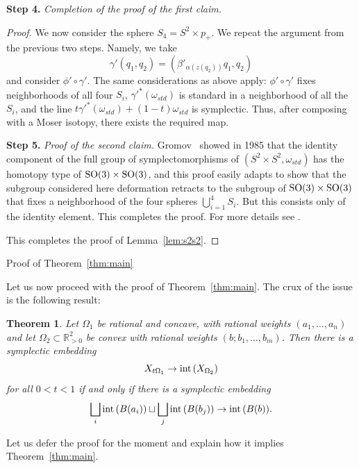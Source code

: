 \documentclass[11pt, reqno]{amsart}
\makeatletter
\def\subsection{\@startsection{subsection}{2}%
  \z@{.75\linespacing\@plus.7\linespacing}{-.5em}%
  {\normalfont\large\bfseries}}
\newtheorem{thm}{Theorem}[subsection]
\theoremstyle{remark}
\numberwithin{equation}{subsection}
\numberwithin{figure}{section}
\theoremstyle{customremark}
\newcommand{\SO}{{\rm SO}}
\newcommand{\intt}{{\rm int}}
\newcommand{\NI}{{\noindent}}
\newcommand{\om}{{\omega}}
\newcommand{\MS}{{\medskip}}
\newcommand{\R}{\mathbb{R}}
\makeatother
\begin{document}
\NI
{\bf Step 4.}  {\it Completion of the proof of the first claim.}
\begin{proof}
We now consider the sphere $S_4 = S^2 \times p_+$.  We repeat the argument from the previous two steps.  Namely, we take 
\[ \gamma'(q_1, q_2) = (\beta'_{\alpha(z(q_2))} q_1, q_2)\]
and consider $\phi' \circ \gamma'$. 
The same considerations as above apply: $\phi' \circ \gamma'$ fixes neighborhoods of all four $S_i$, $\gamma'^*(\om_{std})$
 is standard in a neighborhood of all the $S_i$, and the line $t  \gamma'^*(\om_{std}) + (1-t) \omega_{std}$ is symplectic.  Thus, after composing with a Moser isotopy, there exists the required map.
 \MS
 
 \NI
 {\bf Step 5.}  {\it Proof of the second claim.}
 Gromov~\cite{GRO} showed in 1985 that the identity component of the full group 
  of symplectomorphisms of $(S^2\times S^2, \om_{std})$ has the homotopy type of $\SO(3)\times \SO(3)$, and this proof easily adapts to show that the subgroup considered here deformation retracts to the subgroup of 
$\SO(3)\times \SO(3)$ that fixes a neighborhood of the four spheres $\bigcup_{i=1}^4 S_i$. But this consists only of the identity element.  
This completes the proof. For more details see \cite[Ch.9.5]{JHOL}.
\MS

This completes the proof of Lemma~\ref{lem:s2s2}. \end{proof}




\subsection{Proof of Theorem~\ref{thm:main}}\label{ss:proofmain}

Let us now proceed with the proof of Theorem~\ref{thm:main}.  The crux of the issue is the following result:



\begin{thm}
\label{thm:main1}
Let $\Omega_1$ be rational and concave, with rational weights $(a_1, \ldots, a_n)$ and let $\Omega_2\subset \R^2_{>0}$ be  convex with rational weights $(b; b_1, \ldots, b_m)$.  Then there is a symplectic embedding
\[ X_{t\Omega_1} \to \intt\, (X_{\Omega_2})\]
for all $0<t<1$ if and only if there is a symplectic embedding
\[ \bigsqcup_i \intt\, (B(a_i)) \sqcup \bigsqcup_j \intt\, (B(b_j)) \to \intt\, (B(b)).\]
\end{thm}

Let us defer the proof for the moment and explain how it implies Theorem~\ref{thm:main}.  
\end{document}
